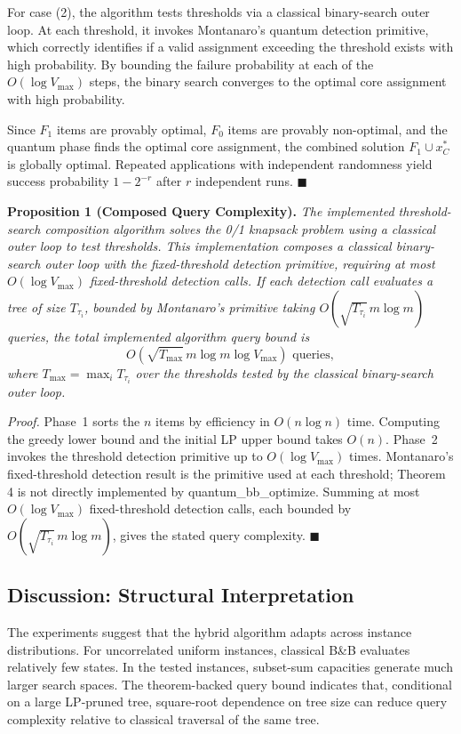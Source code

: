 \documentclass[conference]{IEEEtran} \IEEEoverridecommandlockouts
\begin{document}
For case (2), the algorithm tests thresholds via a classical binary-search outer loop. At each threshold, it invokes Montanaro's quantum detection primitive, which correctly identifies if a valid assignment exceeding the threshold exists with high probability. By bounding the failure probability at each of the $O(\log V_{\max})$ steps, the binary search converges to the optimal core assignment with high probability.

Since $F_1$ items are provably optimal, $F_0$ items are provably non-optimal, and the quantum phase finds the optimal core assignment, the combined solution $F_1 \cup x^*_C$ is globally optimal. Repeated applications with independent randomness yield success probability $1 - 2^{-r}$ after $r$ independent runs. \hfill$\blacksquare$

\textbf{Proposition 1 (Composed Query Complexity).} \textit{The implemented threshold-search composition algorithm solves the 0/1 knapsack problem using a classical outer loop to test thresholds. This implementation composes a classical binary-search outer loop with the fixed-threshold detection primitive, requiring at most $O(\log V_{\max})$ fixed-threshold detection calls. If each detection call evaluates a tree of size $T_{\tau_i}$, bounded by Montanaro's primitive taking $O(\sqrt{T_{\tau_i}}\,m\log m)$ queries, the total implemented algorithm query bound is}
\begin{equation}
    O\!\left(\sqrt{T_{\max}}\,m\log m\log V_{\max}\right) \text{ queries},
    \label{eq:totalcomplexity}
\end{equation}
\textit{where $T_{\max} = \max_i T_{\tau_i}$ over the thresholds tested by the classical binary-search outer loop.}

\textit{Proof.} Phase~1 sorts the $n$ items by efficiency in $O(n \log n)$ time. Computing the greedy lower bound and the initial LP upper bound takes $O(n)$. Phase~2 invokes the threshold detection primitive up to $O(\log V_{\max})$ times. Montanaro's fixed-threshold detection result is the primitive used at each threshold; Theorem 4 is not directly implemented by quantum\_bb\_optimize. Summing at most $O(\log V_{\max})$ fixed-threshold detection calls, each bounded by $O(\sqrt{T_{\tau_i}}\,m\log m)$, gives the stated query complexity. \hfill$\blacksquare$

\subsection{Discussion: Structural Interpretation}
The experiments suggest that the hybrid algorithm adapts across instance distributions. For uncorrelated uniform instances, classical B\&B evaluates relatively few states. In the tested instances, subset-sum capacities generate much larger search spaces. The theorem-backed query bound indicates that, conditional on a large LP-pruned tree, square-root dependence on tree size can reduce query complexity relative to classical traversal of the same tree.
\end{document}
